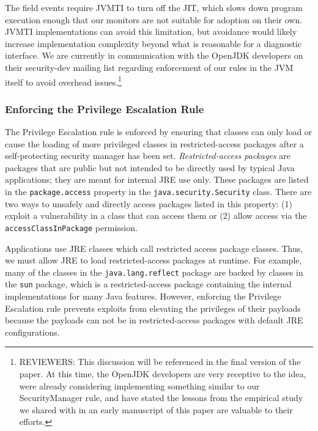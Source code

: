 \documentclass{sig-alternate}
\begin{document}
The field events require JVMTI to turn off the JIT, which slows down program execution enough that our monitors are not suitable for adoption on their own. JVMTI implementations can avoid this limitation, but avoidance would likely increase implementation complexity beyond what is reasonable for a diagnostic interface. We are currently in communication with the OpenJDK developers on their security-dev mailing list regarding enforcement of our rules in the JVM itself to avoid overhead issues.\footnote{REVIEWERS: This discussion will be referenced in the final version of the paper. At this time, the OpenJDK developers are very receptive to the idea, were already considering implementing something similar to our SecurityManager rule, and have stated the lessons from the empirical study we shared with in an early manuscript of this paper are valuable to their efforts.}

\subsubsection{Enforcing the Privilege Escalation Rule}\label{sub:Enforcing-the-Privilege}

The Privilege Escalation rule is enforced by ensuring that classes
can only load or cause the loading of more privileged classes in restricted-access
packages after a self-protecting security manager has been set. \textit{Restricted-access
packages} are packages that are public but not intended to be directly
used by typical Java applications; they are meant for internal JRE
use only. These packages are listed in the \texttt{package.access}
property in the \texttt{java.security.Security} class. There are two
ways to unsafely and directly access packages listed in this property:
(1) exploit a vulnerability in a class that can access them or (2)
allow access via the \texttt{accessClassInPackage} permission.

Applications use JRE classes which call restricted access package
classes. Thus, we must allow JRE to load restricted-access packages
at runtime. For example, many of the classes in the \texttt{java.lang.reflect}
package are backed by classes in the \texttt{sun} package, which is
a restricted-access package containing the internal implementations
for many Java features. However, enforcing the Privilege Escalation
rule prevents exploits from elevating the privileges of their payloads
because the payloads can not be in restricted-access packages with
default JRE configurations. 
\end{document}
